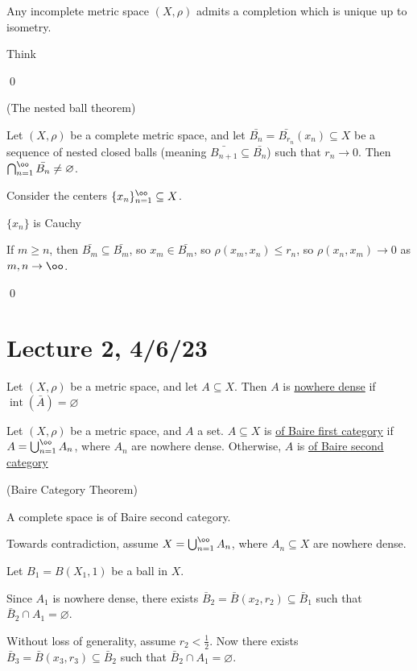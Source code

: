 \documentclass[x11names,reqno,14pt]{extarticle}
\newcommand{\seq}[2][\oo]{_{#2 = 1}^#1}
\newcommand{\bigcupn}[1][\oo]{\bigcup\seq[#1]{n}}
\newcommand{\bigcapn}[1][\oo]{\bigcap\seq[#1]{n}}
\begin{document}
\thm 

Any incomplete metric space $(X,\rho)$ admits a completion which is unique up to isometry. 

\proof

Think

\qed

\thm (The nested ball theorem)

Let $(X,\rho)$ be a complete metric space, and let $\bar{B_n} = \bar{B_{r_n}}(x_n) \subseteq X$ be a sequence of nested closed balls (meaning $\bar{B_{n + 1}} \subseteq \bar{B_n}$) such that $r_n\to0$. Then $\bigcapn \bar{B_n} \neq \varnothing$. 

\proof

Consider the centers $\{x_n\}\seq{n} \subseteq X$. 

\claim $\{x_n\}$ is Cauchy

\proof

If $m \geq n$, then $\bar{B_m} \subseteq \bar{B_m}$, so $x_m \in \bar{B_m}$, so $\rho(x_m, x_n) \leq r_n$, so $\rho(x_n,x_m)\to0$ as $m,n\to\oo$.

\qed

\section*{Lecture 2, 4/6/23}


Let $(X, \rho)$ be a metric space, and let $A \subseteq X$. Then $A$ is \underline{nowhere dense} if $\operatorname{int}(\bar{A}) = \varnothing$


Let $(X, \rho)$ be a metric space, and $A$ a set. $A \subseteq X$ is \underline{of Baire first category} if $A = \bigcupn A_n$, where $A_n$ are nowhere dense. Otherwise, $A$ is \underline{of Baire second category}

\thm (Baire Category Theorem)

A complete space is of Baire second category. 

\proof

Towards contradiction, assume $X = \bigcupn A_n$, where $A_n \subseteq X$ are nowhere dense. 

Let $B_1 = B(X_1, 1)$ be a ball in $X$. 

Since $A_1$ is nowhere dense, there exists $\bar{B}_2 = \bar{B}(x_2, r_2) \subseteq \bar{B}_1$ such that $\bar{B}_2 \cap A_1 = \varnothing$. 

Without loss of generality, assume $r_2 < \frac{1}{2}$. Now there exists $\bar{B}_3 = \bar{B}(x_3, r_3) \subseteq \bar{B}_2$ such that $\bar{B}_2 \cap A_1 = \varnothing$. 
\end{document}

